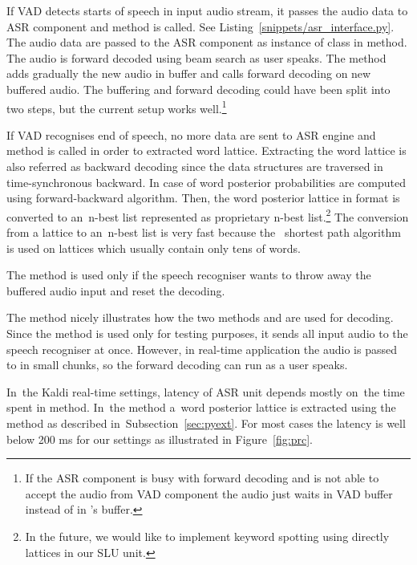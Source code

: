 If \ac{VAD} detects starts of speech in input audio stream, it passes the audio data to \ac{ASR} component and  method is called. 
See Listing~\ref{snippets/asr_interface.py}.
The audio data are passed to the ASR component as instance of class  in  method.
The audio is forward decoded using beam search as user speaks.
The method  adds gradually the new audio in  buffer and calls forward decoding on new buffered audio.
The buffering and forward decoding could have been split into two steps, but the current setup works well.\footnote{If the \ac{ASR} component is busy with forward decoding and is not able to accept the audio from \ac{VAD} component the audio just waits in \ac{VAD} buffer instead of in 's buffer.}

If \ac{VAD} recognises end of speech, no more data are sent to \ac{ASR} engine and  method is called in order to extracted word lattice.
Extracting the word lattice is also referred as backward decoding since the data structures are traversed in time-synchronous backward.
In case of  word posterior probabilities are computed using forward-backward algorithm.
Then, the word posterior lattice in  format is converted to an~n-best list represented as proprietary  n-best list.\footnote{In the future, we would like to implement keyword spotting using directly  lattices in our \ac{SLU} unit.}
The conversion from a lattice to an~n-best list is very fast because the~ shortest path algorithm is used on lattices which usually contain only tens of words.

The  method is used only if the speech recogniser wants to throw away the buffered audio input and reset the decoding.


The method  nicely illustrates how the two methods  and  are used for decoding. 
Since the method is used only for testing purposes, it sends all input audio to the speech recogniser at once.
However, in real-time application the audio is passed to  in small chunks, so the forward decoding can run as a user speaks. 

In~the Kaldi real-time settings, latency of \ac{ASR} unit depends mostly on~the time spent in  method.
In~the  method a~word posterior lattice is extracted using the  method as described in~Subsection~\ref{sec:pyext}. 
For most cases the latency is well below 200 ms for our settings as illustrated in Figure~\ref{fig:prc}.

